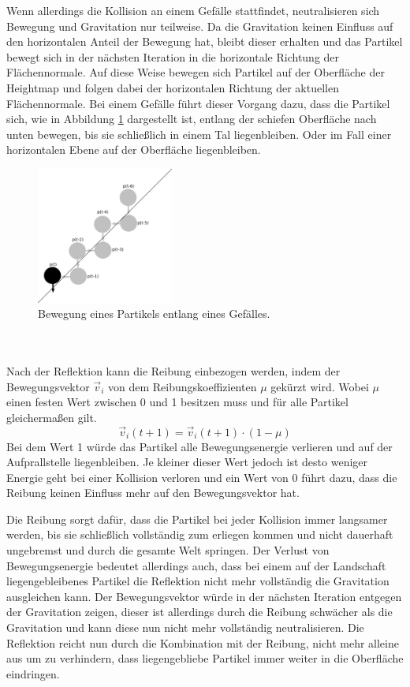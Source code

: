\begin{Spacing}{\mylinespace}
		Wenn allerdings die Kollision an einem Gefälle stattfindet, neutralisieren
		sich Bewegung und Gravitation nur teilweise. Da die Gravitation keinen
		Einfluss auf den horizontalen Anteil der Bewegung hat, bleibt dieser
		erhalten und das Partikel bewegt sich in der nächsten Iteration in die
		horizontale Richtung der Flächennormale.
		Auf diese Weise bewegen sich Partikel auf der Oberfläche der Heightmap
		und folgen dabei der horizontalen Richtung der aktuellen Flächennormale.
		Bei einem Gefälle führt dieser Vorgang dazu, dass die Partikel sich,
		wie in Abbildung \ref{fig:rolling} dargestellt ist,
		entlang der schiefen Oberfläche nach unten bewegen, bis sie schließlich
		in einem Tal liegenbleiben. Oder im Fall einer horizontalen Ebene auf der Oberfläche liegenbleiben.
		\begin{figure}[h!]
			\centering
			\vspace*{30px}
			\includegraphics[width=0.4\textwidth]{graphics/Phys_rolling.png}
			\caption{Bewegung eines Partikels entlang eines Gefälles.}
			\label{fig:rolling}
		\end{figure}

		\\\\
		Nach der Reflektion kann die Reibung einbezogen werden, indem der Bewegungsvektor
		$\vec{v}_{i}$ von dem Reibungskoeffizienten $\mu$ gekürzt wird. Wobei $\mu$
		einen festen Wert zwischen 0 und 1 besitzen muss und für alle Partikel gleichermaßen gilt.
		\[ \vec{v}_{i}(t+1) = \vec{v}_{i}(t+1) \cdot ( 1 - \mu ) \]
		Bei dem Wert 1 würde das Partikel alle Bewegungsenergie verlieren und auf der
		Aufprallstelle liegenbleiben. Je kleiner dieser Wert jedoch ist desto weniger
		Energie geht bei einer Kollision verloren und ein Wert von 0 führt dazu, dass
		die Reibung keinen Einfluss mehr auf den Bewegungsvektor hat.

		Die Reibung sorgt dafür, dass die Partikel bei jeder Kollision immer langsamer
		werden, bis sie schließlich vollständig zum erliegen kommen und
		nicht dauerhaft ungebremst und durch die gesamte Welt springen.
		Der Verlust von Bewegungsenergie bedeutet allerdings auch, dass bei einem auf der
		Landschaft liegengebleibenes Partikel die Reflektion nicht mehr vollständig die
		Gravitation ausgleichen kann. Der Bewegungsvektor würde in der
		nächsten Iteration entgegen der Gravitation zeigen, dieser ist allerdings durch die Reibung
		schwächer als die Gravitation und kann diese nun nicht mehr vollständig neutralisieren. Die Reflektion
		reicht nun durch die Kombination mit der Reibung, nicht mehr alleine aus
		um zu verhindern, dass liegengebliebe Partikel immer weiter in die Oberfläche eindringen.


\end{Spacing}
